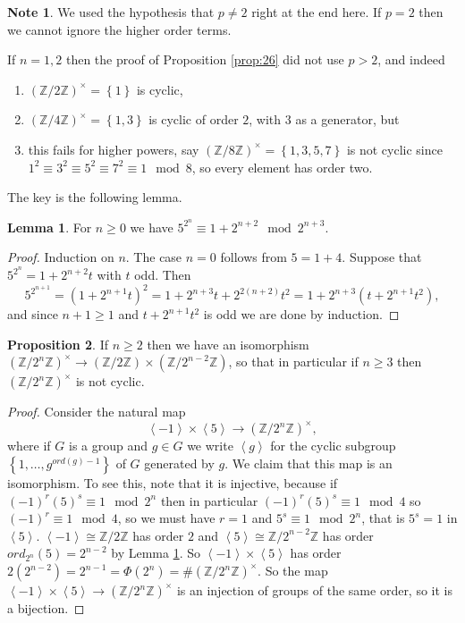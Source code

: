 \documentclass{article}
\newcommand{\Z}{\mathbb{Z}}
\newcommand{\rb}[1]{\left( #1 \right)}
\newcommand{\cb}[1]{\left\{ #1 \right\}}
\newcommand{\ab}[1]{\left\langle #1 \right\rangle}
\newcommand{\unit}[1]{\rb{\Z / #1\Z}^\times}
\theoremstyle{definition}\newtheorem{definition}{Definition}
\theoremstyle{definition}\newtheorem{remark}[definition]{Remark}
\theoremstyle{definition}\newtheorem*{example}{Example}
\theoremstyle{definition}\newtheorem*{note}{Note}
\newtheorem{proposition}[definition]{Proposition}
\newtheorem{lemma}[definition]{Lemma}
\begin{document}
\begin{note}
We used the hypothesis that $ p \ne 2 $ right at the end here. If $ p = 2 $ then we cannot ignore the higher order terms.
\end{note}

If $ n = 1, 2 $ then the proof of Proposition \ref{prop:26} did not use $ p > 2 $, and indeed
\begin{enumerate}
\item $ \unit{2} = \cb{1} $ is cyclic,
\item $ \unit{4} = \cb{1, 3} $ is cyclic of order $ 2 $, with $ 3 $ as a generator, but
\item this fails for higher powers, say $ \unit{8} = \cb{1, 3, 5, 7} $ is not cyclic since $ 1^2 \equiv 3^2 \equiv 5^2 \equiv 7^2 \equiv 1 \mod 8 $, so every element has order two.
\end{enumerate}
The key is the following lemma.

\begin{lemma}
\label{lem:27}
For $ n \ge 0 $ we have $ 5^{2^n} \equiv 1 + 2^{n + 2} \mod 2^{n + 3} $.
\end{lemma}

\begin{proof}
Induction on $ n $. The case $ n = 0 $ follows from $ 5 = 1 + 4 $. Suppose that $ 5^{2^n} = 1 + 2^{n + 2}t $ with $ t $ odd. Then
$$ 5^{2^{n + 1}} = \rb{1 + 2^{n + 1}t}^2 = 1 + 2^{n + 3}t + 2^{2\rb{n + 2}}t^2 = 1 + 2^{n + 3}\rb{t + 2^{n + 1}t^2}, $$
and since $ n + 1 \ge 1 $ and $ t + 2^{n + 1}t^2 $ is odd we are done by induction.
\end{proof}

\begin{proposition}
If $ n \ge 2 $ then we have an isomorphism $ \unit{2^n} \to \rb{\Z / 2\Z} \times \rb{\Z / 2^{n - 2}\Z} $, so that in particular if $ n \ge 3 $ then $ \unit{2^n} $ is not cyclic.
\end{proposition}

\begin{proof}
Consider the natural map
$$ \ab{-1} \times \ab{5} \to \unit{2^n}, $$
where if $ G $ is a group and $ g \in G $ we write $ \ab{g} $ for the cyclic subgroup $ \cb{1, \dots, g^{ord\rb{g} - 1}} $ of $ G $ generated by $ g $. We claim that this map is an isomorphism. To see this, note that it is injective, because if $ \rb{-1}^r\rb{5}^s \equiv 1 \mod 2^n $ then in particular $ \rb{-1}^r\rb{5}^s \equiv 1 \mod 4 $ so $ \rb{-1}^r \equiv 1 \mod 4 $, so we must have $ r = 1 $ and $ 5^s \equiv 1 \mod 2^n $, that is $ 5^s = 1 $ in $ \ab{5} $. $ \ab{-1} \cong \Z / 2\Z $ has order $ 2 $ and $ \ab{5} \cong \Z / 2^{n - 2}\Z $ has order $ ord_{2^n}\rb{5} = 2^{n - 2} $ by Lemma \ref{lem:27}. So $ \ab{-1} \times \ab{5} $ has order $ 2\rb{2^{n - 2}} = 2^{n - 1} = \Phi\rb{2^n} = \#\unit{2^n} $. So the map $ \ab{-1} \times \ab{5} \to \unit{2^n} $ is an injection of groups of the same order, so it is a bijection.
\end{proof}
\end{document}
